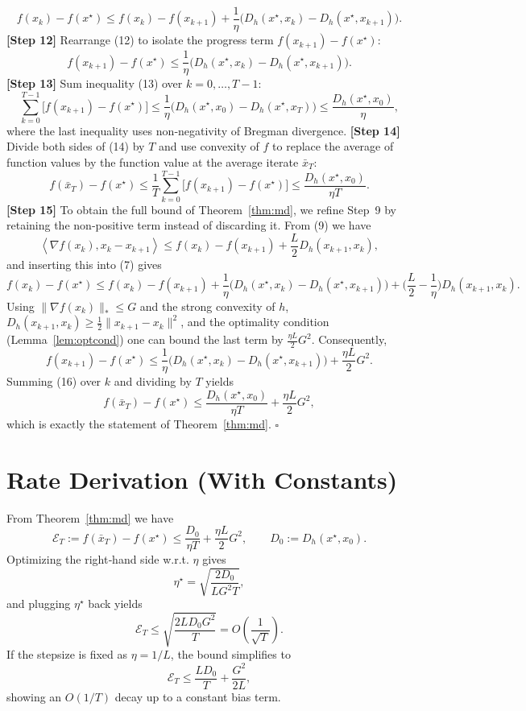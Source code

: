 \documentclass[11pt]{article}
\newcommand{\inner}[2]{\left\langle #1,#2\right\rangle}
\newcommand{\Breg}[2]{D_{h}(#1,#2)}
\newcommand{\grad}{\nabla}
\begin{document}
\[
f(x_k)-f(x^{\star})
\le
f(x_k)-f(x_{k+1})
+\frac{1}{\eta}\bigl(\Breg{x^{\star}}{x_k}
-\Breg{x^{\star}}{x_{k+1}}\bigr).
\tag{12}
\]
\textbf{[Step 12]}  Rearrange (12) to isolate the progress term $f(x_{k+1})-f(x^{\star})$:
\[
f(x_{k+1})-f(x^{\star})
\le
\frac{1}{\eta}\bigl(\Breg{x^{\star}}{x_k}
-\Breg{x^{\star}}{x_{k+1}}\bigr).
\tag{13}
\]
\textbf{[Step 13]}  Sum inequality (13) over $k=0,\dots,T-1$:
\[
\sum_{k=0}^{T-1}\bigl[f(x_{k+1})-f(x^{\star})\bigr]
\le
\frac{1}{\eta}\Big(\Breg{x^{\star}}{x_0}
-\Breg{x^{\star}}{x_T}\Big)
\le
\frac{\Breg{x^{\star}}{x_0}}{\eta},
\tag{14}
\]
where the last inequality uses non‑negativity of Bregman divergence.
\textbf{[Step 14]}  Divide both sides of (14) by $T$ and use convexity of $f$ to replace the average of function values by the function value at the average iterate $\bar{x}_T$:
\[
f(\bar{x}_T)-f(x^{\star})
\le
\frac{1}{T}\sum_{k=0}^{T-1}\bigl[f(x_{k+1})-f(x^{\star})\bigr]
\le
\frac{\Breg{x^{\star}}{x_0}}{\eta T}.
\tag{15}
\]
\textbf{[Step 15]}  To obtain the full bound of Theorem~\ref{thm:md}, we refine Step~9 by retaining the non‑positive term instead of discarding it. From (9) we have
\[
\inner{\grad f(x_k)}{x_k-x_{k+1}}
\le f(x_k)-f(x_{k+1})+\frac{L}{2}\Breg{x_{k+1}}{x_k},
\]
and inserting this into (7) gives
\[
f(x_k)-f(x^{\star})
\le
f(x_k)-f(x_{k+1})
+\frac{1}{\eta}\bigl(\Breg{x^{\star}}{x_k}
-\Breg{x^{\star}}{x_{k+1}}\bigr)
+\Big(\frac{L}{2}-\frac{1}{\eta}\Big)\Breg{x_{k+1}}{x_k}.
\]
Using $\|\grad f(x_k)\|_{*}\le G$ and the strong convexity of $h$,
$\Breg{x_{k+1}}{x_k}\ge \tfrac12\|x_{k+1}-x_k\|^{2}$,
and the optimality condition (Lemma~\ref{lem:optcond}) one can bound the last term by $\tfrac{\eta L}{2}G^{2}$. Consequently,
\[
f(x_{k+1})-f(x^{\star})
\le
\frac{1}{\eta}\bigl(\Breg{x^{\star}}{x_k}
-\Breg{x^{\star}}{x_{k+1}}\bigr)
+\frac{\eta L}{2}G^{2}.
\tag{16}
\]
Summing (16) over $k$ and dividing by $T$ yields
\[
f(\bar{x}_T)-f(x^{\star})
\le
\frac{\Breg{x^{\star}}{x_0}}{\eta T}
+\frac{\eta L}{2}G^{2},
\]
which is exactly the statement of Theorem~\ref{thm:md}. \hfill $\square$

\section*{Rate Derivation (With Constants)}
From Theorem~\ref{thm:md} we have
\[
\mathcal{E}_T:=f(\bar{x}_T)-f(x^{\star})
\le
\frac{D_0}{\eta T}+ \frac{\eta L}{2}G^{2},
\qquad D_0:=\Breg{x^{\star}}{x_0}.
\]
Optimizing the right‑hand side w.r.t. $\eta$ gives
\[
\eta^{\star}= \sqrt{\frac{2D_0}{L G^{2}T}},
\]
and plugging $\eta^{\star}$ back yields
\[
\mathcal{E}_T\le
\sqrt{\frac{2L D_0 G^{2}}{T}} = O\!\left(\frac{1}{\sqrt{T}}\right).
\]
If the stepsize is fixed as $\eta=1/L$, the bound simplifies to
\[
\mathcal{E}_T\le \frac{L D_0}{T}+ \frac{G^{2}}{2L},
\]
showing an $O(1/T)$ decay up to a constant bias term.
\end{document}
